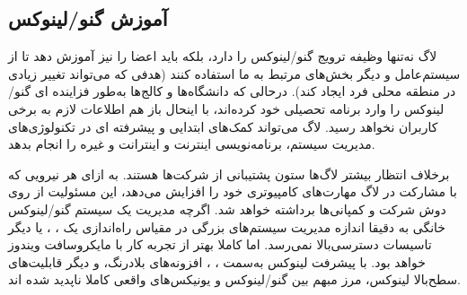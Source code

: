 \subsection{آموزش گنو/لینوکس}

لاگ نه‌تنها وظیفه ترویج گنو/لینوکس را دارد، بلکه باید اعضا را نیز آموزش دهد
تا از سیستم‌عامل و دیگر بخش‌های مرتبط به ما استفاده کنند (هدفی که می‌تواند
تغییر زیادی در منطقه محلی فرد ایجاد کند). 
درحالی که دانشگاه‌ها و کالج‌ها به‌طور فزاینده ای گنو/لینوکس را
وارد برنامه تحصیلی خود کرده‌اند، با اینحال باز هم اطلاعات لازم به برخی کاربران نخواهد رسید.
لاگ می‌تواند کمک‌های ابتدایی و پیشرفته ای در تکنولوژی‌های مدیریت سیستم، برنامه‌نویسی
اینترنت و اینترانت و غیره را انجام بدهد.

برخلاف انتظار بیشتر لاگ‌ها ستون پشتیبانی از شرکت‌ها هستند.
به ازای هر نیرویی که با مشارکت در لاگ مهارت‌های کامپیوتری خود را
افزایش می‌دهد، این مسئولیت از روی دوش شرکت و کمپانی‌ها برداشته خواهد شد.
اگرچه مدیریت یک سیستم گنو/لینوکس خانگی به دقیقا اندازه مدیریت سیستم‌های
بزرگی در مقیاس راه‌اندازی یک
،
،
یا دیگر تاسیسات دسترسی‌بالا نمی‌رسد. اما کاملا بهتر از تجربه کار با
مایکروسافت ویندوز خواهد بود.
با پیشرفت لینوکس به‌سمت
،
،
افزونه‌های بلادرنگ، و دیگر قابلیت‌های سطح‌بالا لینوکس،
مرز مبهم بین گنو/لینوکس و یونیکس‌های واقعی کاملا ناپدید شده اند.

